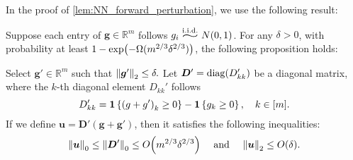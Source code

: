 In the proof of \cref{lem:NN_forward_perturbation}, we use the following result:
\begin{lemma}
  \label{lem:Allen_Claim 8.3}

  Suppose each entry of $\bm{g} \in \mathbb{R}^m$ follows $g_i \iid {N}(0,1)$.
  For any $\delta > 0$, with probability at least $1-\exp\xkm{-\Omega(m^{2/3}\delta^{2/3})} $, the following proposition holds:

  Select $\bm{g}' \in \mathbb{R}^m$ such that $ \norm{\bm{g}'}_2\leq\delta.$
  Let $\bm{D}' = \mathrm{diag}(D'_{kk})$ be a diagonal matrix, where the $k$-th diagonal element
  $D_{kk}' $ follows
  $$D_{k k}^{\prime}=\boldsymbol{1}\left\{\left(g+g^{\prime}\right)_{k} \geq 0\right\}-\boldsymbol{1}\left\{g_{k} \geq 0\right\},\quad k\in[m].$$
  If we define $\bm{u} = \bm{D}'(\bm{g}+\bm{g}')$, then it satisfies the following inequalities:
  \[\norm{\bm{u}}_0 \leq \norm{\bm{D}'}_0 \leq O\xkm{m^{2/3}\delta^{2/3}} \quad \text{ and }\quad \norm{\bm{u}}_2 \leq O(\delta).\]
\end{lemma}

